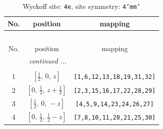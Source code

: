 \documentclass[fleqn,8pt]{jsarticle}
\begin{document}
\renewcommand{\arraystretch}{1.2}
\begin{longtable}{ccc}
\caption{Wyckoff site: {\tt 4e}, site symmetry: {\tt 4'mm'}}
 \\
 \hline \hline
No. & position & mapping \\ \hline \endfirsthead

\multicolumn{2}{l}{\tablename\ \thetable{}} \\
 \hline \hline
No. & position & mapping \\ \hline \endhead

 \hline \hline
\multicolumn{2}{r}{\footnotesize\it continued ...} \\ \endfoot

 \hline \hline
\multicolumn{2}{r}{} \\ \endlastfoot

1 & $\left[ \frac{1}{2},\, 0,\, z \right]$ & {\tt [1,6,12,13,18,19,31,32]} \\ \hline
2 & $\left[ 0,\, \frac{1}{2},\, z + \frac{1}{2} \right]$ & {\tt [2,3,15,16,17,22,28,29]} \\ \hline
3 & $\left[ \frac{1}{2},\, 0,\, - z \right]$ & {\tt [4,5,9,14,23,24,26,27]} \\ \hline
4 & $\left[ 0,\, \frac{1}{2},\, \frac{1}{2} - z \right]$ & {\tt [7,8,10,11,20,21,25,30]} \\
\end{longtable}
\renewcommand{\arraystretch}{1.2}
\end{document}
